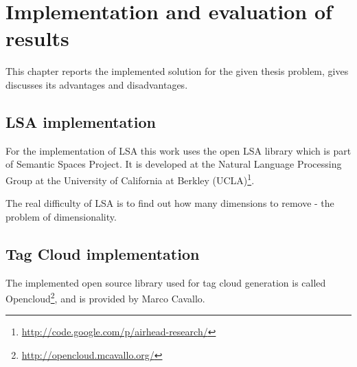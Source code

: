 \chapter{Implementation and evaluation of results}
\label{sec:implementation}

\begin{summary}
This chapter reports the implemented solution for the given thesis problem, gives discusses its advantages and disadvantages.
\end{summary}

\section{LSA implementation}
\label{sec:implementation:lsa_impl}
For the implementation of LSA this work uses the open LSA library which is part of Semantic Spaces Project\cite{S-Space}. It is developed at the Natural Language Processing Group at the University of California at Berkley (UCLA)\footnote{\url{http://code.google.com/p/airhead-research/}}.

The real difficulty of LSA is to find out how many dimensions to remove - the problem of dimensionality.

\section{Tag Cloud implementation}
\label{sec:implementation:tag_cloud}
The implemented open source library used for tag cloud generation is called Opencloud\footnote{\url{http://opencloud.mcavallo.org/}}, and is provided by Marco Cavallo.
